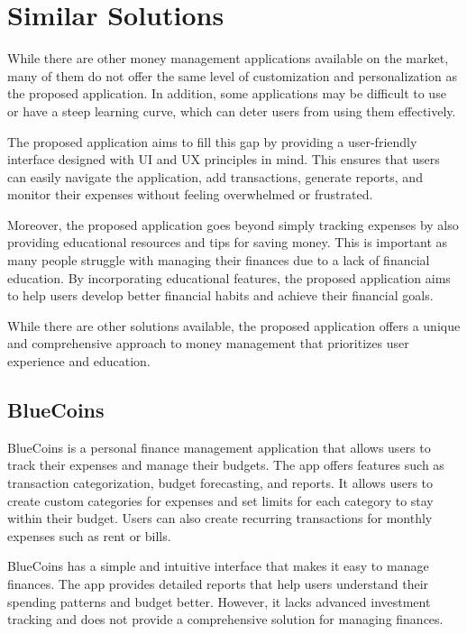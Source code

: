 \section{Similar Solutions}\label{sect:similar solutions}
\hspace{\parindent} While there are other money management applications available on the market, many of them do not offer the same level of customization and personalization as the proposed application. In addition, some applications may be difficult to use or have a steep learning curve, which can deter users from using them effectively.

\hspace{\parindent}The proposed application aims to fill this gap by providing a user-friendly interface designed with UI and UX principles in mind. This ensures that users can easily navigate the application, add transactions, generate reports, and monitor their expenses without feeling overwhelmed or frustrated.

\hspace{\parindent}Moreover, the proposed application goes beyond simply tracking expenses by also providing educational resources and tips for saving money. This is important as many people struggle with managing their finances due to a lack of financial education. By incorporating educational features, the proposed application aims to help users develop better financial habits and achieve their financial goals.

\hspace{\parindent}While there are other solutions available, the proposed application offers a unique and comprehensive approach to money management that prioritizes user experience and education.


\subsection{BlueCoins}
BlueCoins is a personal finance management application that allows users to track their expenses and manage their budgets. The app offers features such as transaction categorization, budget forecasting, and reports. It allows users to create custom categories for expenses and set limits for each category to stay within their budget. Users can also create recurring transactions for monthly expenses such as rent or bills.

BlueCoins has a simple and intuitive interface that makes it easy to manage finances. The app provides detailed reports that help users understand their spending patterns and budget better. However, it lacks advanced investment tracking and does not provide a comprehensive solution for managing finances.

